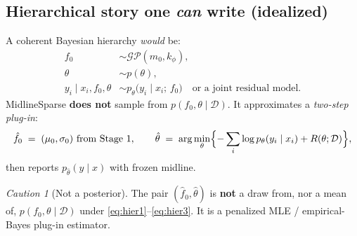 \documentclass[11pt,a4paper]{article}
\theoremstyle{plain}
\theoremstyle{definition}
\theoremstyle{remark}
\newtheorem{caution}[theorem]{Caution}
\newcommand{\GP}{\mathcal{GP}}
\newcommand{\D}{\mathcal{D}}
\newcommand{\tht}{\theta}
\begin{document}
\subsection{Hierarchical story one \emph{can} write (idealized)}
A coherent Bayesian hierarchy \emph{would} be:
\begin{align}
  f_0
  &\sim
  \GP(m_0,k_\phi),
  \label{eq:hier1}
  \\
  \tht
  &\sim
  p(\tht),
  \label{eq:hier2}
  \\
  y_i\mid x_i,f_0,\tht
  &\sim
  p_\tht\!\bigl(y_i\mid x_i;\,f_0\bigr)
  \quad\text{or a joint residual model}.
  \label{eq:hier3}
\end{align}
MidlineSparse \textbf{does not} sample from \(p(f_0,\tht\mid\D)\).
It approximates a \emph{two-step plug-in}:
\begin{equation}
  \hat f_0
  \;=\;
  (\mu_0,\sigma_0)
  \text{ from Stage~1},
  \qquad
  \hat\tht
  \;=\;
  \arg\min_\tht
  \Bigl\{
    -\sum_i\log p_\tht(y_i\mid x_i)
    +
    R(\tht;\D)
  \Bigr\},
  \label{eq:twostep}
\end{equation}
then reports \(p_{\hat\tht}(y\mid x)\) with frozen midline.

\begin{caution}[Not a posterior]
The pair \((\hat f_0,\hat\tht)\) is \textbf{not} a draw from, nor a mean of,
\(p(f_0,\tht\mid\D)\) under \eqref{eq:hier1}--\eqref{eq:hier3}.
It is a penalized MLE / empirical-Bayes plug-in estimator.
\end{caution}
\end{document}
